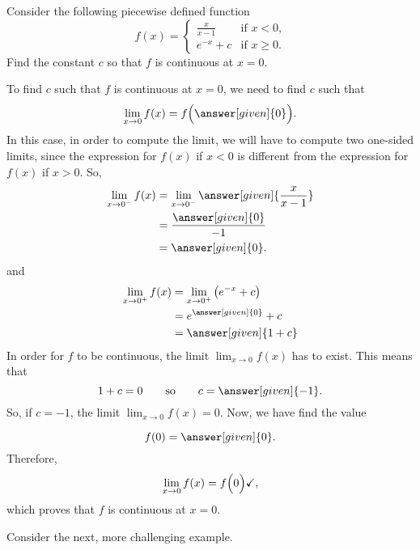 \documentclass{ximera}
\begin{document}
\begin{example}
Consider the following piecewise defined function
\[
f(x) = 
\begin{cases}
  \frac{x}{x-1} &\text{if $x<0$,}\\
  e^{-x} + c &\text{if $x\ge 0$}.
\end{cases}
\]
Find the constant $c$ so that $f$ is continuous at $x=0$.
\begin{explanation}
  To find $c$ such that $f$ is continuous at $x=0$, we need to find
  $c$ such that
    \[
 \lim_{x\to 0} f(x) = f\Bigl(\answer[given]{0}\Bigr).
  \]
  In this case, in order to compute the limit, we will have to compute two one-sided limits, since the expression for  $f(x)$ if $x<0$ is  different from the expression for $f(x)$ if $x>0$.
  So,
  \begin{align*}
    \lim_{x\to 0^-} f(x) &= \lim_{x\to 0^-}\answer[given]{\frac{x}{x-1}}\\
    &= \frac{\answer[given]{0}}{-1}\\
    &=\answer[given]{0}.
  \end{align*}
and
  \begin{align*}
    \lim_{x\to 0^+} f(x) &= \lim_{x\to 0^+}\left(e^{-x}+c\right)\\
    &= e^{\answer[given]{0}} + c\\
    &= \answer[given]{1+ c}
  \end{align*}
  In order for $f$ to be continuous, the limit $ \lim_{x\to 0} f(x)$ has to exist. This means that
  \[
  1 + c = 0\qquad\text{so}\qquad c = \answer[given]{-1}.
  \]
  So, if $c=-1$, the limit $ \lim_{x\to 0} f(x)=0$. Now, we have find the value

\[
  f(0) = \answer[given]{0}.
  \]
  Therefore,
   \[
 \lim_{x\to 0} f(x) = f\Bigl(0\Bigr)\checkmark,
  \]
  which proves that $f$ is continuous at $x=0$.
\end{explanation}
\end{example}


Consider the next, more challenging example.
\end{document}
